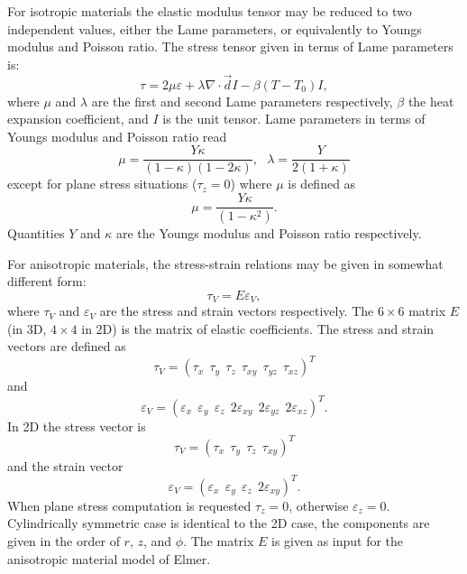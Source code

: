 For isotropic materials the elastic modulus tensor may be reduced to
two independent values, either the Lame parameters, or equivalently
to Youngs modulus and Poisson ratio. The stress tensor given 
in terms of Lame parameters is:
\begin{equation}
\tau = 2 \mu \varepsilon + \lambda\nabla\cdot\Vec{d} I - \beta(T-T_0)I,
\end{equation}
where $\mu$ and $\lambda$ are the first and second Lame parameters respectively,
$\beta$ the heat expansion coefficient,
and $I$ is the unit tensor. Lame parameters in terms of Youngs modulus and
Poisson ratio read
\begin{equation}
 \mu = \frac{Y \kappa}{( 1 - \kappa ) ( 1-2\kappa )},\ \ \  
 \lambda = \frac{Y}{2(1+\kappa)}
\end{equation}
except for plane stress situations ($\tau_z=0$) where $\mu$ is defined as
\begin{equation}
 \mu = \frac{Y \kappa}{( 1 - \kappa^2 ) }.
\end{equation}
Quantities $Y$ and $\kappa$ are the Youngs modulus and Poisson ratio respectively.

For anisotropic materials, the stress-strain relations may be given in somewhat different
form:
\begin{equation}
\tau_V = E \varepsilon_V,
\end{equation}
where $\tau_V$ and $\varepsilon_V$ are the stress and strain vectors respectively.
The $6\times6$ matrix $E$ (in 3D, $4\times4$ in 2D) is the matrix of elastic
coefficients. The stress and strain vectors are defined as
\begin{equation}
\tau_V = \left( \tau_x\ \ \tau_y\ \ \tau_z\ \ \tau_{xy}\ \ \tau_{yz}\ \ \tau_{xz} \right)^T
\end{equation}
and
\begin{equation}
\varepsilon_V = \left( \varepsilon_x\ \ \varepsilon_y\ \ \varepsilon_z\ \  
2\varepsilon_{xy}\ \ 2\varepsilon_{yz}\ \ 2\varepsilon_{xz} \right)^T.
\end{equation}
In 2D the stress vector is
\begin{equation}
\tau_V = \left( \tau_x\ \ \tau_y\ \ \tau_z\ \ \tau_{xy} \right)^T
\end{equation}
and the strain vector
\begin{equation}
\varepsilon_V = \left( \varepsilon_x\ \ \varepsilon_y\ \ \varepsilon_z\ \ 2\varepsilon_{xy}\right)^T.
\end{equation}
When plane stress computation is requested  $\tau_z=0$, otherwise $\varepsilon_z=0$.
Cylindrically symmetric case is identical to the 2D case, the components are given
in the order of $r$, $z$, and $\phi$. The matrix $E$ is given as input for
the anisotropic material model of Elmer.

